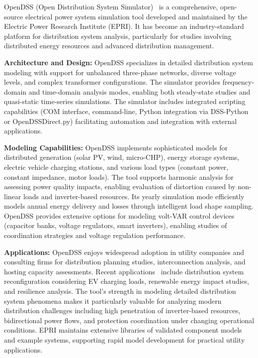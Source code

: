 OpenDSS (Open Distribution System Simulator)~\cite{opendss} is a comprehensive, open-source electrical power system simulation tool developed and maintained by the Electric Power Research Institute (EPRI). It has become an industry-standard platform for distribution system analysis, particularly for studies involving distributed energy resources and advanced distribution management.

\textbf{Architecture and Design:} OpenDSS specializes in detailed distribution system modeling with support for unbalanced three-phase networks, diverse voltage levels, and complex transformer configurations. The simulator provides frequency-domain and time-domain analysis modes, enabling both steady-state studies and quasi-static time-series simulations. The simulator includes integrated scripting capabilities (COM interface, command-line, Python integration via DSS-Python or OpenDSSDirect.py) facilitating automation and integration with external applications.

\textbf{Modeling Capabilities:} OpenDSS implements sophisticated models for distributed generation (solar PV, wind, micro-CHP), energy storage systems, electric vehicle charging stations, and various load types (constant power, constant impedance, motor loads). The tool supports harmonic analysis for assessing power quality impacts, enabling evaluation of distortion caused by non-linear loads and inverter-based resources. Its yearly simulation mode efficiently models annual energy delivery and losses through intelligent load shape sampling. OpenDSS provides extensive options for modeling volt-VAR control devices (capacitor banks, voltage regulators, smart inverters), enabling studies of coordination strategies and voltage regulation performance.

\textbf{Applications:} OpenDSS enjoys widespread adoption in utility companies and consulting firms for distribution planning studies, interconnection analysis, and hosting capacity assessments. Recent applications~\cite{opendss_application} include distribution system reconfiguration considering EV charging loads, renewable energy impact studies, and resilience analysis. The tool's strength in modeling detailed distribution system phenomena makes it particularly valuable for analyzing modern distribution challenges including high penetration of inverter-based resources, bidirectional power flows, and protection coordination under changing operational conditions. EPRI maintains extensive libraries of validated component models and example systems, supporting rapid model development for practical utility applications.

